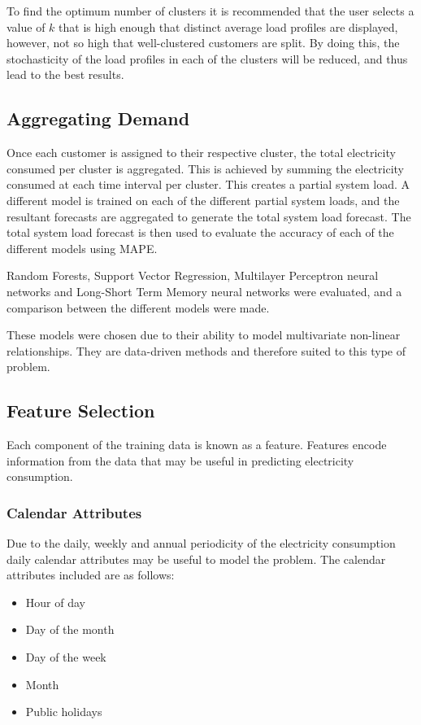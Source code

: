 To find the optimum number of clusters it is recommended that the user selects a value of $k$ that is high enough that distinct average load profiles are displayed, however, not so high that well-clustered customers are split. By doing this, the stochasticity of the load profiles in each of the clusters will be reduced, and thus lead to the best results.


\subsection{Aggregating Demand}

Once each customer is assigned to their respective cluster, the total electricity consumed per cluster is aggregated. This is achieved by summing the electricity consumed at each time interval per cluster. This creates a partial system load. A different model is trained on each of the different partial system loads, and the resultant forecasts are aggregated to generate the total system load forecast. The total system load forecast is then used to evaluate the accuracy of each of the different models using MAPE. 

Random Forests, Support Vector Regression, Multilayer Perceptron neural networks and Long-Short Term Memory neural networks were evaluated, and a comparison between the different models were made. 

These models were chosen due to their ability to model multivariate non-linear relationships. They are data-driven methods and therefore suited to this type of problem.

\subsection{Feature Selection}

Each component of the training data is known as a feature. Features encode information from the data that may be useful in predicting electricity consumption. 

\subsubsection{Calendar Attributes}

Due to the daily, weekly and annual periodicity of the electricity consumption daily calendar attributes may be useful to model the problem. The calendar attributes included are as follows:

\begin{itemize}
	\item Hour of day
	\item Day of the month
	\item Day of the week
	\item Month
	\item Public holidays
\end{itemize}

